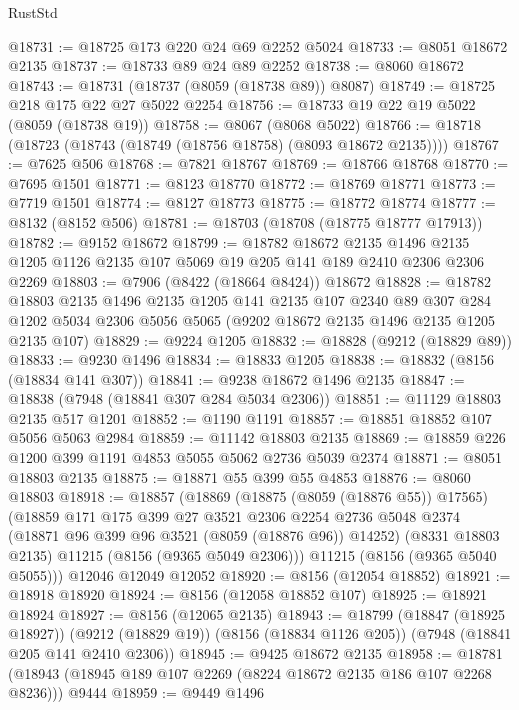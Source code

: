 \begin{lexlean}{RustStd}
\begin{coremodule}
@18731 := @18725 @173 @220 @24 @69 @2252 @5024
@18733 := @8051 @18672 @2135
@18737 := @18733 @89 @24 @89 @2252
@18738 := @8060 @18672
@18743 := @18731 (@18737 (@8059 (@18738 @89)) @8087)
@18749 := @18725 @218 @175 @22 @27 @5022 @2254
@18756 := @18733 @19 @22 @19 @5022 (@8059 (@18738 @19))
@18758 := @8067 (@8068 @5022)
@18766 := @18718 (@18723 (@18743 (@18749 (@18756 @18758) (@8093 @18672 @2135))))
@18767 := @7625 @506
@18768 := @7821 @18767
@18769 := @18766 @18768
@18770 := @7695 @1501
@18771 := @8123 @18770
@18772 := @18769 @18771
@18773 := @7719 @1501
@18774 := @8127 @18773
@18775 := @18772 @18774
@18777 := @8132 (@8152 @506)
@18781 := @18703 (@18708 (@18775 @18777 @17913))
@18782 := @9152 @18672
@18799 := @18782
    @18672
    @2135
    @1496
    @2135
    @1205
    @1126
    @2135
    @107
    @5069
    @19
    @205
    @141
    @189
    @2410
    @2306
    @2306
    @2269
@18803 := @7906 (@8422 (@18664 @8424)) @18672
@18828 := @18782
    @18803
    @2135
    @1496
    @2135
    @1205
    @141
    @2135
    @107
    @2340
    @89
    @307
    @284
    @1202
    @5034
    @2306
    @5056
    @5065
    (@9202 @18672 @2135 @1496 @2135 @1205 @2135 @107)
@18829 := @9224 @1205
@18832 := @18828 (@9212 (@18829 @89))
@18833 := @9230 @1496
@18834 := @18833 @1205
@18838 := @18832 (@8156 (@18834 @141 @307))
@18841 := @9238 @18672 @1496 @2135
@18847 := @18838 (@7948 (@18841 @307 @284 @5034 @2306))
@18851 := @11129 @18803 @2135 @517 @1201
@18852 := @1190 @1191
@18857 := @18851 @18852 @107 @5056 @5063 @2984
@18859 := @11142 @18803 @2135
@18869 := @18859 @226 @1200 @399 @1191 @4853 @5055 @5062 @2736 @5039 @2374
@18871 := @8051 @18803 @2135
@18875 := @18871 @55 @399 @55 @4853
@18876 := @8060 @18803
@18918 := @18857
    (@18869
      (@18875 (@8059 (@18876 @55)) @17565)
      (@18859
        @171
        @175
        @399
        @27
        @3521
        @2306
        @2254
        @2736
        @5048
        @2374
        (@18871 @96 @399 @96 @3521 (@8059 (@18876 @96)) @14252)
        (@8331 @18803 @2135)
        @11215
        (@8156 (@9365 @5049 @2306)))
      @11215
      (@8156 (@9365 @5040 @5055)))
    @12046
    @12049
    @12052
@18920 := @8156 (@12054 @18852)
@18921 := @18918 @18920
@18924 := @8156 (@12058 @18852 @107)
@18925 := @18921 @18924
@18927 := @8156 (@12065 @2135)
@18943 := @18799
    (@18847 (@18925 @18927))
    (@9212 (@18829 @19))
    (@8156 (@18834 @1126 @205))
    (@7948 (@18841 @205 @141 @2410 @2306))
@18945 := @9425 @18672 @2135
@18958 := @18781 (@18943 (@18945 @189 @107 @2269 (@8224 @18672 @2135 @186 @107 @2268 @8236))) @9444
@18959 := @9449 @1496

\end{coremodule}
\end{lexlean}
